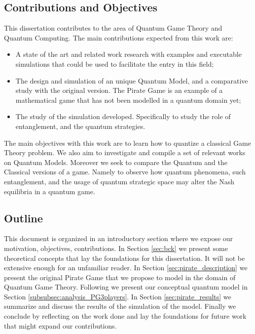 \documentclass[10pt,twocolumn]{llncs}
\begin{document}
\subsection{Contributions and Objectives}
This dissertation contributes to the area of Quantum Game Theory and Quantum Computing. The main contributions expected from this work are:

\begin{itemize}

\item A state of the art and related work research with examples and executable simulations that could be used to facilitate the entry in this field;

\item The design and simulation of an unique Quantum Model, and a comparative study with the original version. The Pirate Game is an example of a mathematical game that has not been modelled in a quantum domain yet;

\item The study of the simulation developed. Specifically to study the role of entanglement, and the quantum strategies.
\end{itemize}
The main objectives with this work are to learn how to quantize a classical Game Theory problem. We also aim to investigate and compile a set of relevant works on Quantum Models. Moreover we seek to compare the Quantum and the Classical versions of a game. Namely to observe how quantum phenomena, such entanglement, and the usage of quantum strategic space may alter the Nash equilibria in a quantum game.


\subsection{Outline}
\label{sec:int_outline}

This document is organized in an introductory section where we expose our motivation, objectives, contributions.
In Section \ref{sec:bck} we present some theoretical concepts that lay the foundations for this dissertation. It will not be extensive enough for an unfamiliar reader.
In Section \ref{sec:pirate_description} we present the original Pirate Game that we propose to model in the domain of Quantum Game Theory.
Following we present our conceptual quantum model in Section \ref{subsubsec:analysis_PG3players}. In Section \ref{sec:pirate_results} we summarize and discuss the results of the simulation of the model. Finally we conclude by reflecting on the work done and lay the foundations for future work that might expand our contributions.
 
\end{document}
